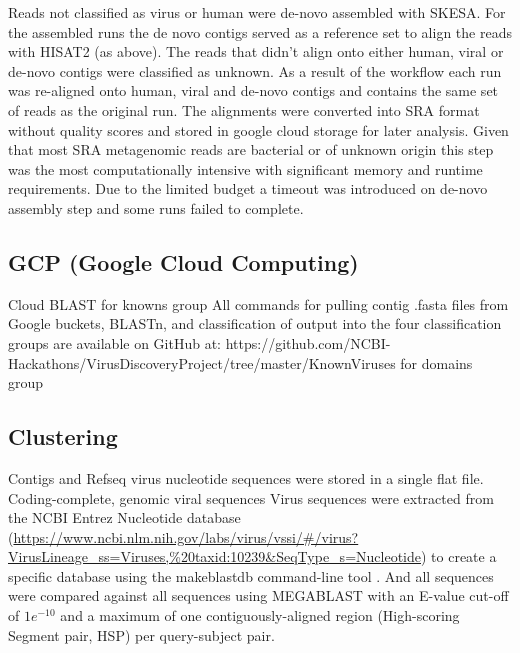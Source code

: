   Reads not classified as virus or human were de-novo assembled with SKESA. For
  the assembled runs the de novo contigs served as a reference set to align the
  reads with HISAT2 (as above). The reads that didn't align onto either human,
  viral or de-novo contigs were classified as unknown. As a result of the
  workflow each run was re-aligned onto human, viral and de-novo contigs and
  contains the same set of reads as the original run. The alignments were
  converted into SRA format without quality scores and stored in google cloud
  storage for later analysis. Given that most SRA metagenomic reads are
  bacterial or of unknown origin this step was the most computationally
  intensive with significant memory and runtime requirements. Due to the
  limited budget a timeout was introduced on de-novo assembly step and some
  runs failed to complete.

  \subsection{GCP (Google Cloud Computing)}
  Cloud BLAST
  for knowns group
  All commands for pulling contig .fasta files from Google buckets, BLASTn, and classification of output into the four classification groups are available on GitHub at: https://github.com/NCBI-Hackathons/VirusDiscoveryProject/tree/master/KnownViruses
  for domains group

  \subsection{Clustering}
  Contigs and Refseq virus nucleotide sequences were stored in a single flat
  file. Coding-complete, genomic viral sequences Virus sequences were extracted
  from the NCBI Entrez Nucleotide database
  (\url{https://www.ncbi.nlm.nih.gov/labs/virus/vssi/#/virus?VirusLineage_ss=Viruses,%20taxid:10239&SeqType_s=Nucleotide})
  to create a specific database using the makeblastdb command-line tool
  \cite{Camacho2009}. And all sequences were  compared against all sequences
  using MEGABLAST \cite{Camacho2009} with an E-value cut-off of $1e^{-10}$ and
  a maximum of one contiguously-aligned region (High-scoring Segment pair, HSP)
  per query-subject pair.


